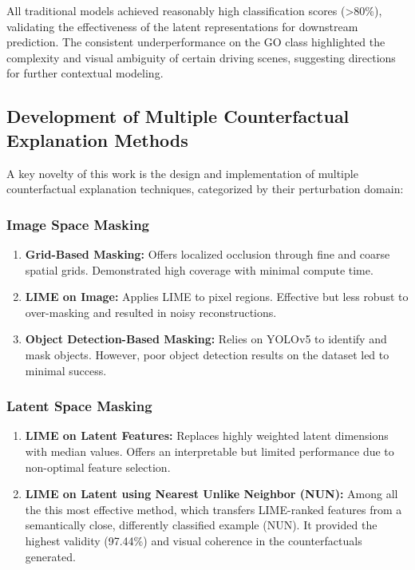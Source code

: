 All traditional models achieved reasonably high classification scores (>80\%), validating the effectiveness of the latent representations for downstream prediction. The consistent underperformance on the GO class highlighted the complexity and visual ambiguity of certain driving scenes, suggesting directions for further contextual modeling.

\subsection{Development of Multiple Counterfactual Explanation Methods}

A key novelty of this work is the design and implementation of multiple counterfactual explanation techniques, categorized by their perturbation domain:

\subsubsection{Image Space Masking}
\begin{enumerate}
    \item \textbf{Grid-Based Masking:} Offers localized occlusion through fine and coarse spatial grids. Demonstrated high coverage with minimal compute time.
    \item \textbf{LIME on Image:} Applies LIME to pixel regions. Effective but less robust to over-masking and resulted in noisy reconstructions.
    \item \textbf{Object Detection-Based Masking:} Relies on YOLOv5 to identify and mask objects. However, poor object detection results on the dataset led to minimal success.
\end{enumerate}

\subsubsection{Latent Space Masking}
\begin{enumerate}
    \item \textbf{LIME on Latent Features:} Replaces highly weighted latent dimensions with median values. Offers an interpretable but limited performance due to non-optimal feature selection.
    \item \textbf{LIME on Latent using Nearest Unlike Neighbor (NUN):} Among all the this most effective method, which transfers LIME-ranked features from a semantically close, differently classified example (NUN). It provided the highest validity (97.44\%) and visual coherence in the counterfactuals generated.
\end{enumerate}

